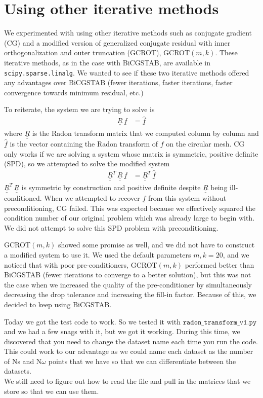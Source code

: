 \documentclass[12pt]{article}
\newcommand{\bunderline}[1]{\underline{#1}}
\renewcommand{\vec}[1]{{\bunderline{#1}}}
\newcommand{\mat}[1]{{\bunderline{\bunderline{#1}}}}
\begin{document}
\section*{Using other iterative methods}
We experimented with using other iterative methods such as conjugate gradient (CG) and a modified version of generalized conjugate residual with inner orthogonalization and outer truncation (GCROT), GCROT$(m, k)$.
These iterative methods, as in the case with BiCGSTAB, are available in \verb|scipy.sparse.linalg|.
We wanted to see if these two iterative methods offered any advantages over BiCGSTAB (fewer iterations, faster iterations, faster convergence towards minimum residual, etc.)
\par 
To reiterate, the system we are trying to solve is 
\begin{align*}
	\mat{R} \, \vec{f} & = \vec{\hat{f}}
\end{align*}
where $\mat{R}$ is the Radon transform matrix that we computed column by column and $\vec{\hat{f}}$ is the vector containing the Radon transform of $f$ on the circular mesh.
CG only works if we are solving a system whose matrix is symmetric, positive definite (SPD), so we attempted to solve the modified system
\begin{align*}
	\mat{R}^{T} \, \mat{R} \, \vec{f} & = \mat{R}^{T} \, \vec{\hat{f}}
\end{align*}
$\mat{R}^{T} \, \mat{R}$ is symmetric by construction and positive definite despite $\mat{R}$ being ill-conditioned.
When we attempted to recover $\vec{f}$ from this system without preconditioning, CG failed. 
This was expected because we effectively squared the condition number of our original problem which was already large to begin with.
We did not attempt to solve this SPD problem with preconditioning.
\par 
GCROT$(m, k)$ showed some promise as well, and we did not have to construct a modified system to use it.
We used the default parameters $m, k = 20$, and we noticed that with poor pre-conditioners, GCROT$(m, k)$ performed better than BiCGSTAB (fewer iterations to converge to a better solution), but this was not the case when we increased the quality of the pre-conditioner by simultaneously decreasing the drop tolerance and increasing the fill-in factor.
Because of this, we decided to keep using BiCGSTAB.

Today we got the test code to work. So we tested it with $\texttt{radon\_transform\_v1.py}$ and we had a few snags with it, but we got it working. During this time, we discovered that you need to change the dataset name each time you run the code. This could work to our advantage as we could name each dataset as the number of Ns and N$\omega$ points that we have so that we can differentiate between the datasets. \\
We still need to figure out how to read the file and pull in the matrices that we store so that we can use them.
\end{document}
